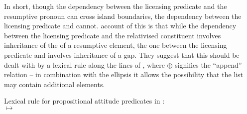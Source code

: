 \documentclass[output=paper,biblatex,babelshorthands,newtxmath,draftmode,colorlinks,citecolor=brown]{langscibook}
\begin{document}
In short, though the dependency between the licensing predicate and the resumptive pronoun
can cross island boundaries, the dependency between the licensing predicate and 
cannot.  account of this is that while the dependency between the
licensing predicate and the relativised constituent
involves inheritance of the \localv of a resumptive element, the one between the licensing predicate
and  involves inheritance of a gap. They suggest that this should be dealt with by a
lexical rule along the lines of , where $\oplus$ signifies the ``append'' relation --
in combination with the ellipsis it allows the possibility that the \comps list may contain
additional elements.
\begin{exe}\ex\label{x:rc-79}  Lexical rule for propositional attitude predicates in :\\
$\mapsto$\\\medskip
\flushright
{}\bigskip
\end{exe}%
\end{document}

